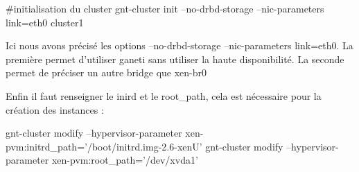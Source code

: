 #initialisation du cluster
gnt-cluster init --no-drbd-storage --nic-parameters link=eth0 cluster1

Ici nous avons précisé les options --no-drbd-storage --nic-parameters link=eth0.
La première permet d'utiliser ganeti sans utiliser la haute disponibilité.
La seconde permet de préciser un autre bridge que xen-br0

Enfin il faut renseigner le inird et le root_path, cela est nécessaire pour la création des instances :

gnt-cluster modify --hypervisor-parameter xen-pvm:initrd_path='/boot/initrd.img-2.6-xenU'
gnt-cluster modify --hypervisor-parameter xen-pvm:root_path='/dev/xvda1'


